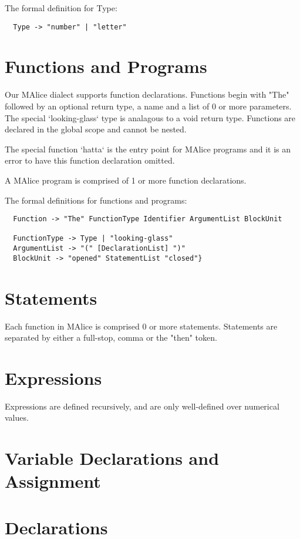 \documentclass[a4wide, 11pt]{article}
\begin{document}
The formal definition for Type:
\begin{verbatim}
  Type -> "number" | "letter"
\end{verbatim}

\section{Functions and Programs}

Our MAlice dialect supports function declarations. Functions begin with "The" followed by an optional return type, a name and a list of 0 or more parameters. The special `looking-glass` type is analagous to a void return type. Functions are declared in the global scope and cannot be nested.

The special function `hatta` is the entry point for MAlice programs and it is an error to have this function declaration omitted.

A MAlice program is comprised of 1 or more function declarations.

The formal definitions for functions and programs:

\begin{verbatim}
  Function -> "The" FunctionType Identifier ArgumentList BlockUnit

  FunctionType -> Type | "looking-glass"
  ArgumentList -> "(" [DeclarationList] ")"
  BlockUnit -> "opened" StatementList "closed"}
\end{verbatim}

\section{Statements}

Each function in MAlice is comprised 0 or more statements. Statements are separated by either a full-stop, comma or the "then" token.
  
\section{Expressions}

Expressions are defined recursively, and are only well-defined over numerical values.

\section{Variable Declarations and Assignment}

\section{Declarations}
\end{document}
